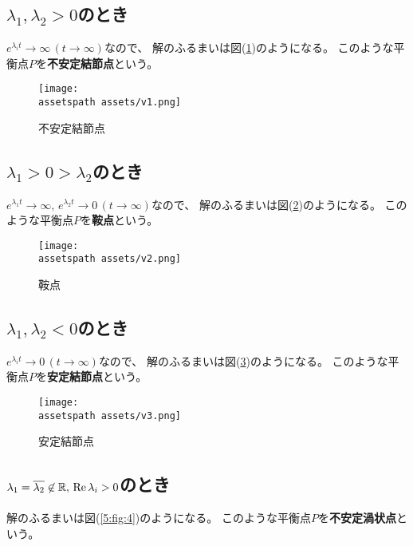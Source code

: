 \documentclass[report]{jlreq}
\def\assetspath{../}
\begin{document}
\subsection{$\lambda_1, \lambda_2 > 0$のとき}

$e^{\lambda_i t} \to \infty\, (t \to \infty)$なので、
解のふるまいは図(\ref{5:fig:1})のようになる。
このような平衡点$P$を\textbf{不安定結節点}という。

\begin{figure}[H]
    \centering
    \texttt{[image: \\assetspath assets/v1.png]}
    \caption{不安定結節点}
    \label{5:fig:1}
\end{figure}

\subsection{$\lambda_1 > 0 > \lambda_2$のとき}

$e^{\lambda_1 t} \to \infty,\, e^{\lambda_2 t} \to 0\, (t \to \infty)$なので、
解のふるまいは図(\ref{5:fig:2})のようになる。
このような平衡点$P$を\textbf{鞍点}という。

\begin{figure}[H]
    \centering
    \texttt{[image: \\assetspath assets/v2.png]}
    \caption{鞍点}
    \label{5:fig:2}
\end{figure}

\subsection{$\lambda_1, \lambda_2 < 0$のとき}

$e^{\lambda_i t} \to 0\, (t \to \infty)$なので、
解のふるまいは図(\ref{5:fig:3})のようになる。
このような平衡点$P$を\textbf{安定結節点}という。

\begin{figure}[H]
    \centering
    \texttt{[image: \\assetspath assets/v3.png]}
    \caption{安定結節点}
    \label{5:fig:3}
\end{figure}

\subsection{
    \texorpdfstring{%
        $\lambda_1 = \overline{\lambda_2} \not\in \mathbb{R},\, \operatorname{\mathrm{Re}} \lambda_i > 0$のとき%
    }{%
    }%
}

解のふるまいは図(\ref{5:fig:4})のようになる。
このような平衡点$P$を\textbf{不安定渦状点}という。
\end{document}

